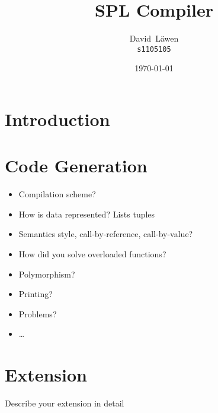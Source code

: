 \documentclass{report}
\author{%
	David~L\"awen\\
	\small\texttt{s1105105}
}
\date{\today}
\title{SPL Compiler}
\begin{document}
\maketitle%

\tableofcontents%

\chapter{Introduction}










\chapter{Code Generation}
\begin{itemize}
	\item Compilation scheme?
	\item How is data represented? Lists tuples
	\item Semantics style, call-by-reference, call-by-value?
	\item How did you solve overloaded functions?
	\item Polymorphism?
	\item Printing?
	\item Problems?
	\item\ldots
\end{itemize}

\chapter{Extension}
Describe your extension in detail
\end{document}
